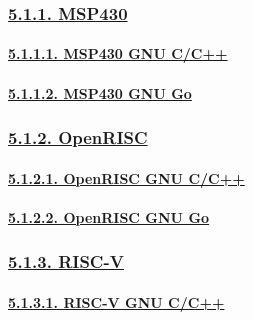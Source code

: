 \documentclass[
]{article}
\begin{document}
\hypertarget{msp430-1}{%
\subsubsection{\texorpdfstring{\protect\hyperlink{msp430-4}{5.1.1.
MSP430}}{5.1.1. MSP430}}\label{msp430-1}}

\hypertarget{msp430-gnu-cc}{%
\paragraph{\texorpdfstring{\protect\hyperlink{msp430-gnu-cc-1}{5.1.1.1.
MSP430 GNU C/C++}}{5.1.1.1. MSP430 GNU C/C++}}\label{msp430-gnu-cc}}

\hypertarget{msp430-gnu-go}{%
\paragraph{\texorpdfstring{\protect\hyperlink{msp430-gnu-go-1}{5.1.1.2.
MSP430 GNU Go}}{5.1.1.2. MSP430 GNU Go}}\label{msp430-gnu-go}}

\hypertarget{openrisc-1}{%
\subsubsection{\texorpdfstring{\protect\hyperlink{openrisc-4}{5.1.2.
OpenRISC}}{5.1.2. OpenRISC}}\label{openrisc-1}}

\hypertarget{openrisc-gnu-cc}{%
\paragraph{\texorpdfstring{\protect\hyperlink{openrisc-gnu-cc-1}{5.1.2.1.
OpenRISC GNU
C/C++}}{5.1.2.1. OpenRISC GNU C/C++}}\label{openrisc-gnu-cc}}

\hypertarget{openrisc-gnu-go}{%
\paragraph{\texorpdfstring{\protect\hyperlink{openrisc-gnu-go-1}{5.1.2.2.
OpenRISC GNU Go}}{5.1.2.2. OpenRISC GNU Go}}\label{openrisc-gnu-go}}

\hypertarget{risc-v-1}{%
\subsubsection{\texorpdfstring{\protect\hyperlink{risc-v-4}{5.1.3.
RISC-V}}{5.1.3. RISC-V}}\label{risc-v-1}}

\hypertarget{risc-v-gnu-cc}{%
\paragraph{\texorpdfstring{\protect\hyperlink{risc-v-gnu-cc-1}{5.1.3.1.
RISC-V GNU C/C++}}{5.1.3.1. RISC-V GNU C/C++}}\label{risc-v-gnu-cc}}
\end{document}
